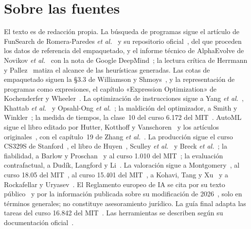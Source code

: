 \documentclass[11pt,a4paper,twoside,openany]{book}
\begin{document}
\section*{Sobre las fuentes}
El texto es de redacción propia. La búsqueda de programas sigue el artículo de FunSearch de Romera-Paredes \emph{et al.}~\cite{funsearch} y su repositorio oficial~\cite{funsearch-code}, del que proceden los datos de referencia del empaquetado, y el informe técnico de AlphaEvolve de Novikov \emph{et al.}~\cite{alphaevolve} con la nota de Google DeepMind~\cite{ae-blog}; la lectura crítica de Herrmann y Pallez~\cite{hp} matiza el alcance de las heurísticas generadas. Las cotas de empaquetado siguen la §3.3 de Williamson y Shmoys~\cite{ws}, y la representación de programas como expresiones, el capítulo «Expression Optimization» de Kochenderfer y Wheeler~\cite{kw}. La optimización de instrucciones sigue a Yang \emph{et al.}~\cite{opro}, Khattab \emph{et al.}~\cite{dspy} y Opsahl-Ong \emph{et al.}~\cite{mipro}; la maldición del optimizador, a Smith y Winkler~\cite{smith}; la medida de tiempos, la clase~10 del curso 6.172 del MIT~\cite{mit6172}. AutoML sigue el libro editado por Hutter, Kotthoff y Vanschoren~\cite{automl} y los artículos originales~\cite{autoweka,sh,hyperband,bergstra,zoph,enas,darts,real,lt}, con el capítulo~19 de Zhang \emph{et al.}~\cite{d2l}. La producción sigue el curso CS329S de Stanford~\cite{cs329s}, el libro de Huyen~\cite{huyen}, Sculley \emph{et al.}~\cite{sculley} y Breck \emph{et al.}~\cite{breck}; la fiabilidad, a Barlow y Proschan~\cite{bp} y al curso 1.010 del MIT~\cite{mit1010}; la evaluación contrafactual, a Dudík, Langford y Li~\cite{dudik}. La valoración sigue a Montgomery~\cite{montgomery}, al curso 18.05 del MIT~\cite{mit1805}, al curso 15.401 del MIT~\cite{mit15401}, a Kohavi, Tang y Xu~\cite{kohavi} y a Rockafellar y Uryasev~\cite{ru}. El Reglamento europeo de IA se cita por su texto público~\cite{aiact} y por la información publicada sobre su modificación de 2026~\cite{omnibus}, solo en términos generales; no constituye asesoramiento jurídico. La guía final adapta las tareas del curso 16.842 del MIT~\cite{mit16842}. Las herramientas se describen según su documentación oficial~\cite{openevolve,dspy,optuna,mlflow,dvc,evidently,ray,fastapi,k8s}.
\end{document}
